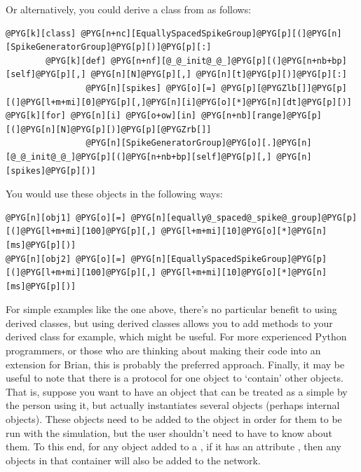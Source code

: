 \documentclass[letterpaper,10pt,english]{manual}
\begin{document}
Or alternatively, you could derive a class from \hyperlink{brian.SpikeGeneratorGroup}{}
as follows:

\begin{Verbatim}[commandchars=@\[\]]
@PYG[k][class] @PYG[n+nc][EquallySpacedSpikeGroup]@PYG[p][(]@PYG[n][SpikeGeneratorGroup]@PYG[p][)]@PYG[p][:]
        @PYG[k][def] @PYG[n+nf][@_@_init@_@_]@PYG[p][(]@PYG[n+nb+bp][self]@PYG[p][,] @PYG[n][N]@PYG[p][,] @PYG[n][t]@PYG[p][)]@PYG[p][:]
                @PYG[n][spikes] @PYG[o][=] @PYG[p][@PYGZlb[]]@PYG[p][(]@PYG[l+m+mi][0]@PYG[p][,]@PYG[n][i]@PYG[o][*]@PYG[n][dt]@PYG[p][)] @PYG[k][for] @PYG[n][i] @PYG[o+ow][in] @PYG[n+nb][range]@PYG[p][(]@PYG[n][N]@PYG[p][)]@PYG[p][@PYGZrb[]]
                @PYG[n][SpikeGeneratorGroup]@PYG[o][.]@PYG[n][@_@_init@_@_]@PYG[p][(]@PYG[n+nb+bp][self]@PYG[p][,] @PYG[n][spikes]@PYG[p][)]
\end{Verbatim}

You would use these objects in the following ways:

\begin{Verbatim}[commandchars=@\[\]]
@PYG[n][obj1] @PYG[o][=] @PYG[n][equally@_spaced@_spike@_group]@PYG[p][(]@PYG[l+m+mi][100]@PYG[p][,] @PYG[l+m+mi][10]@PYG[o][*]@PYG[n][ms]@PYG[p][)]
@PYG[n][obj2] @PYG[o][=] @PYG[n][EquallySpacedSpikeGroup]@PYG[p][(]@PYG[l+m+mi][100]@PYG[p][,] @PYG[l+m+mi][10]@PYG[o][*]@PYG[n][ms]@PYG[p][)]
\end{Verbatim}

For simple examples like the one above, there's no particular benefit to
using derived classes, but using derived classes allows you to add
methods to your derived class for example, which might be useful. For
more experienced Python programmers, or those who are thinking about
making their code into an extension for Brian, this is probably the
preferred approach.
Finally, it may be useful to note that there is a protocol for one object
to `contain' other objects. That is, suppose you want to have an object
that can be treated as a simple \hyperlink{brian.NeuronGroup}{} by the person using it,
but actually instantiates several objects (perhaps internal \hyperlink{brian.Connection}{}
objects). These objects need to be added to the \hyperlink{brian.Network}{} object
in order for them to be run with the simulation, but the user shouldn't need
to have to know about them. To this end, for any object added to a
\hyperlink{brian.Network}{}, if it has an attribute , then any
objects in that container will also be added to the network.
\end{document}
